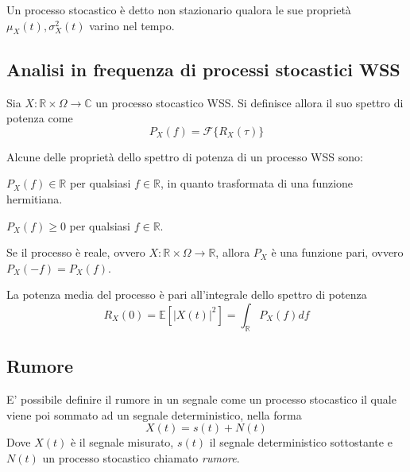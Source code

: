     \begin{definition}
        Un processo stocastico è detto non stazionario qualora le sue proprietà $\mu_{X}(t), \sigma_{X}^2(t)$ varino nel tempo.
    \end{definition}

    \subsection{Analisi in frequenza di processi stocastici WSS}
        \begin{definition}
            Sia $X: \mathbb{R} \times \Omega \rightarrow \mathbb{C}$ un processo stocastico WSS.
            Si definisce allora il suo spettro di potenza come
            \[
                P_{X}(f) = \mathcal{F}\{R_{X}(\tau)\}
            \]
        \end{definition}

        Alcune delle proprietà dello spettro di potenza di un processo WSS sono:

        \begin{property}
            $P_{X}(f) \in \mathbb{R}$ per qualsiasi $f \in \mathbb{R}$, in quanto trasformata di una funzione hermitiana.
        \end{property}

        \begin{property}
            $P_{X}(f) \geq 0$ per qualsiasi $f \in \mathbb{R}$.
        \end{property}

        \begin{property}[Simmetria]
            Se il processo è reale, ovvero $X: \mathbb{R} \times \Omega \rightarrow \mathbb{R}$, allora $P_{X}$ è una funzione pari, ovvero $P_{X}(-f) = P_{X}(f)$.
        \end{property}

        \begin{property}[Potenza]
            La potenza media del processo è pari all'integrale dello spettro di potenza
            \[
                R_{X}(0) = \mathbb{E}[|X(t)|^2] = \int_{\mathbb{R}} P_{X}(f) df
            \]
        \end{property}

    \subsection{Rumore}
        E' possibile definire il rumore in un segnale come un processo stocastico il quale viene poi sommato ad un segnale deterministico, nella forma
        \[
            X(t) = s(t) + N(t)
        \]
        Dove $X(t)$ è il segnale misurato, $s(t)$ il segnale deterministico sottostante e $N(t)$ un processo stocastico chiamato \textit{rumore}.

